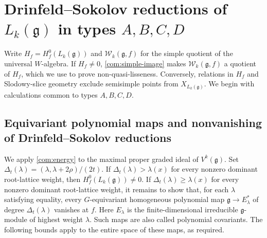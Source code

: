 \documentclass[11pt,a4paper]{amsart}
\numberwithin{equation}{section}
\theoremstyle{definition}
\theoremstyle{remark}
\newcommand{\g}{\mathfrak g}
\begin{document}
\section{Drinfeld--Sokolov reductions of \texorpdfstring{$L_k(\g)$}{Lk(g)} in types \texorpdfstring{$A,B,C,D$}{A, B, C, D}}\label{seed:section}
\label{seed:classification}
Write $H_f=H_f^0(L_k(\g))$ and $\mathcal W_k(\g,f)$ for the simple
quotient of the universal $W$-algebra. If $H_f\ne0$,
\cref{com:simple-image} makes $\mathcal W_k(\g,f)$ a quotient of $H_f$,
which we use to prove non-quasi-lisseness. Conversely, relations in
$H_f$ and Slodowy-slice geometry exclude semisimple points from
$X_{L_k(\g)}$. We begin with calculations common to types $A,B,C,D$.


\subsection{Equivariant polynomial maps and nonvanishing of Drinfeld--Sokolov reductions}\label{seed:energy}
We apply \cref{com:energy} to the maximal proper graded ideal of $V^k(\g)$. Set
$\Delta_t(\lambda)=(\lambda,\lambda+2\rho)/(2t)$. If
$\Delta_t(\lambda)>\lambda(x)$ for every nonzero dominant root-lattice
weight, then $H_f^0(L_k(\g))\ne0$. If
$\Delta_t(\lambda)\ge\lambda(x)$ for every nonzero dominant
root-lattice weight, it remains to show that, for each $\lambda$
satisfying equality, every $G$-equivariant homogeneous polynomial map
$\g\to E_\lambda^*$ of degree $\Delta_t(\lambda)$ vanishes at $f$.
Here $E_\lambda$
is the finite-dimensional irreducible $\g$-module of highest weight
$\lambda$. Such maps are also called polynomial covariants. The
following bounds apply to the entire space of these maps, as required.
\end{document}

